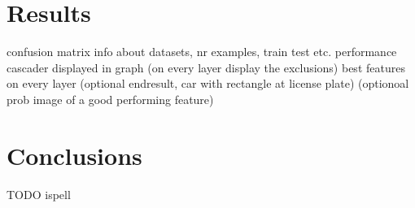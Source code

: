 \documentclass[a4paper,11pt]{article}
\begin{document}
\section*{Results}
confusion matrix
info about datasets, nr examples, train test etc.
performance cascader displayed in graph (on every layer display the exclusions)
best features on every layer
(optional endresult, car with rectangle at license plate)
(optionoal prob image of a good performing feature)


\section*{Conclusions}
TODO ispell

\renewcommand\bibname{References}


\end{document}
